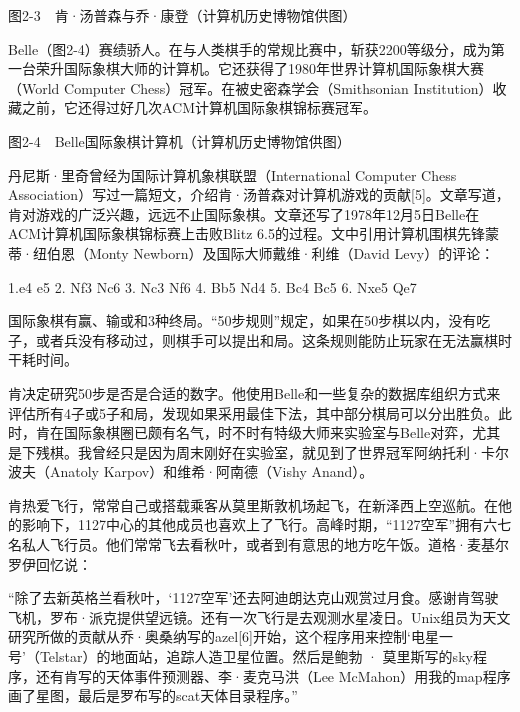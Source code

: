\documentclass[a4paper,12pt,UTF8,twoside]{ctexbook}
\begin{document}
{图2-3　肯·汤普森与乔·康登（计算机历史博物馆供图）

Belle（图2-4）赛绩骄人。在与人类棋手的常规比赛中，斩获2200等级分，成为第一台荣升国际象棋大师的计算机。它还获得了1980年世界计算机国际象棋大赛（World Computer Chess）冠军。在被史密森学会（Smithsonian Institution）收藏之前，它还得过好几次ACM计算机国际象棋锦标赛冠军。



图2-4　Belle国际象棋计算机（计算机历史博物馆供图）

丹尼斯·里奇曾经为国际计算机象棋联盟（International Computer Chess Association）写过一篇短文，介绍肯·汤普森对计算机游戏的贡献[5]。文章写道，肯对游戏的广泛兴趣，远远不止国际象棋。文章还写了1978年12月5日Belle在ACM计算机国际象棋锦标赛上击败Blitz 6.5的过程。文中引用计算机围棋先锋蒙蒂·纽伯恩（Monty Newborn）及国际大师戴维·利维（David Levy）的评论：

1.e4 e5 2. Nf3 Nc6 3. Nc3 Nf6 4. Bb5 Nd4 5. Bc4 Bc5 6. Nxe5 Qe7




国际象棋有赢、输或和3种终局。“50步规则”规定，如果在50步棋以内，没有吃子，或者兵没有移动过，则棋手可以提出和局。这条规则能防止玩家在无法赢棋时干耗时间。

肯决定研究50步是否是合适的数字。他使用Belle和一些复杂的数据库组织方式来评估所有4子或5子和局，发现如果采用最佳下法，其中部分棋局可以分出胜负。此时，肯在国际象棋圈已颇有名气，时不时有特级大师来实验室与Belle对弈，尤其是下残棋。我曾经只是因为周末刚好在实验室，就见到了世界冠军阿纳托利·卡尔波夫（Anatoly Karpov）和维希·阿南德（Vishy Anand）。

肯热爱飞行，常常自己或搭载乘客从莫里斯敦机场起飞，在新泽西上空巡航。在他的影响下，1127中心的其他成员也喜欢上了飞行。高峰时期，“1127空军”拥有六七名私人飞行员。他们常常飞去看秋叶，或者到有意思的地方吃午饭。道格·麦基尔罗伊回忆说：

“除了去新英格兰看秋叶，‘1127空军’还去阿迪朗达克山观赏过月食。感谢肯驾驶飞机，罗布·派克提供望远镜。还有一次飞行是去观测水星凌日。Unix组员为天文研究所做的贡献从乔·奥桑纳写的azel[6]开始，这个程序用来控制‘电星一号’（Telstar）的地面站，追踪人造卫星位置。然后是鲍勃 · 莫里斯写的sky程序，还有肯写的天体事件预测器、李·麦克马洪（Lee McMahon）用我的map程序画了星图，最后是罗布写的scat天体目录程序。”



}
\end{document}
